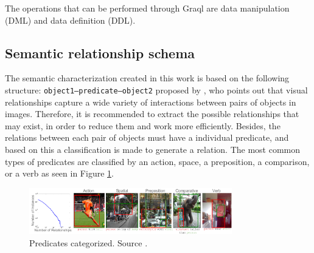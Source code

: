 The operations that can be performed through Graql are data manipulation (DML) 
and data definition (DDL).

\subsection{Semantic relationship schema}
The semantic characterization created in this work is based on the following 
structure: \texttt{object1--predicate--object2} proposed by \cite{Cewu}, who 
points out that visual relationships capture a wide variety of interactions 
between pairs of objects in images. Therefore, it is recommended to extract the 
possible relationships that may exist, in order to reduce them and work more 
efficiently. Besides, the relations between each pair of objects must 
have a individual predicate, and based on this a classification is made 
to generate a relation. The most common types of predicates are classified 
by an action, space, a preposition, a comparison, or a verb as seen in Figure 
\ref{fig:predaCar}.

\begin{figure}[H]
    \centering
    \includegraphics[width=8.8cm]{figures/predica.png}
    \caption{Predicates categorized. Source \cite{Cewu}.}
    \label{fig:predaCar}
\end{figure}

